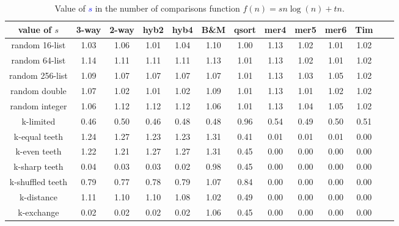 \documentclass[AMA,STIX1COL]{WileyNJD-v2}
\begin{document}
\begin{table}
\caption{Value of \textcolor{blue}{$s$} in the number of comparisons function $f(n) = sn\log(n) + tn$.}
\centering
\begin{tabular}{|c|c|c|c|c|c|c|c|c|c|c|c|c|}
\toprule
value of $s$ & 3-way & 2-way & hyb2 & hyb4 & B\&M& qsort & mer4 & mer5 & mer6 & Tim \\
\midrule
random 16-list	&1.03&	1.06&	1.01&	1.04&	1.10&	1.00&	1.13&	1.02&	1.01&	1.02\\
random 64-list&1.14	&1.11	&1.11	&1.11	&1.13	&1.01	&1.13	&1.02	&1.01	&1.02\\
random 256-list&	1.09&	1.07&	1.07&	1.07&	1.07&	1.01&	1.13&	1.03&	1.05&	1.02\\
random double&	1.07	&1.02	&1.01	&1.02	&1.09	&1.01	&1.13	&1.01	&1.02	&1.02\\
random integer&	1.06	&1.12&	1.12&	1.12&	1.06&	1.01&	1.13&	1.04&	1.05&	1.02\\
k-limited&	0.46	&0.50	&0.46	&0.48	&0.48	&0.96	&0.54	&0.49	&0.50	&0.51\\
k-equal teeth&	1.24&	1.27&	1.23&	1.23&	1.31&	0.41&	0.01&	0.01&	0.01&	0.00\\
k-even teeth&	1.22	&1.21	&1.27	&1.27	&1.31	&0.45	&0.00	&0.00	&0.00	&0.00\\
k-sharp teeth&	0.04	&0.03&	0.03&	0.02&	0.98&	0.45&	0.00&	0.00	&0.00	&0.00\\
k-shuffled teeth&	0.79	&0.77	&0.78	&0.79	&1.07	&0.84	&0.00	&0.00	&0.00	&0.00\\
k-distance&	1.11	&1.10&	1.10&	1.08&	1.02&	0.49&	0.00&	0.00&	0.00&	0.00\\
k-exchange&	0.02	&0.02	&0.02	&0.02	&1.06	&0.45	&0.00	&0.00	&0.00	&0.00\\
\bottomrule
\end{tabular}
\label{table5}
\end{table}
\end{document}
